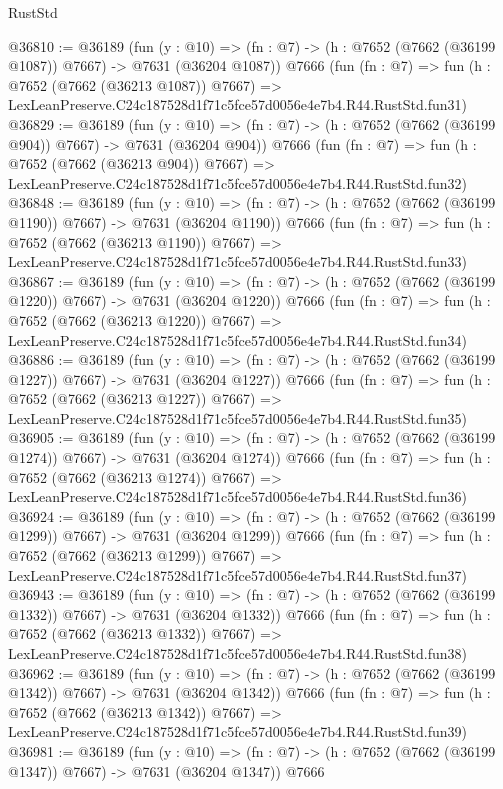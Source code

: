 \begin{lexlean}{RustStd}
\begin{coremodule}
@36810 := @36189
    (fun (y : @10) => (fn : @7) -> (h : @7652 (@7662 (@36199 @1087)) @7667) -> @7631 (@36204 @1087))
    @7666
    (fun (fn : @7) =>
    fun (h : @7652 (@7662 (@36213 @1087)) @7667) =>
    LexLeanPreserve.C24c187528d1f71c5fce57d0056e4e7b4.R44.RustStd.fun31)
@36829 := @36189
    (fun (y : @10) => (fn : @7) -> (h : @7652 (@7662 (@36199 @904)) @7667) -> @7631 (@36204 @904))
    @7666
    (fun (fn : @7) =>
    fun (h : @7652 (@7662 (@36213 @904)) @7667) =>
    LexLeanPreserve.C24c187528d1f71c5fce57d0056e4e7b4.R44.RustStd.fun32)
@36848 := @36189
    (fun (y : @10) => (fn : @7) -> (h : @7652 (@7662 (@36199 @1190)) @7667) -> @7631 (@36204 @1190))
    @7666
    (fun (fn : @7) =>
    fun (h : @7652 (@7662 (@36213 @1190)) @7667) =>
    LexLeanPreserve.C24c187528d1f71c5fce57d0056e4e7b4.R44.RustStd.fun33)
@36867 := @36189
    (fun (y : @10) => (fn : @7) -> (h : @7652 (@7662 (@36199 @1220)) @7667) -> @7631 (@36204 @1220))
    @7666
    (fun (fn : @7) =>
    fun (h : @7652 (@7662 (@36213 @1220)) @7667) =>
    LexLeanPreserve.C24c187528d1f71c5fce57d0056e4e7b4.R44.RustStd.fun34)
@36886 := @36189
    (fun (y : @10) => (fn : @7) -> (h : @7652 (@7662 (@36199 @1227)) @7667) -> @7631 (@36204 @1227))
    @7666
    (fun (fn : @7) =>
    fun (h : @7652 (@7662 (@36213 @1227)) @7667) =>
    LexLeanPreserve.C24c187528d1f71c5fce57d0056e4e7b4.R44.RustStd.fun35)
@36905 := @36189
    (fun (y : @10) => (fn : @7) -> (h : @7652 (@7662 (@36199 @1274)) @7667) -> @7631 (@36204 @1274))
    @7666
    (fun (fn : @7) =>
    fun (h : @7652 (@7662 (@36213 @1274)) @7667) =>
    LexLeanPreserve.C24c187528d1f71c5fce57d0056e4e7b4.R44.RustStd.fun36)
@36924 := @36189
    (fun (y : @10) => (fn : @7) -> (h : @7652 (@7662 (@36199 @1299)) @7667) -> @7631 (@36204 @1299))
    @7666
    (fun (fn : @7) =>
    fun (h : @7652 (@7662 (@36213 @1299)) @7667) =>
    LexLeanPreserve.C24c187528d1f71c5fce57d0056e4e7b4.R44.RustStd.fun37)
@36943 := @36189
    (fun (y : @10) => (fn : @7) -> (h : @7652 (@7662 (@36199 @1332)) @7667) -> @7631 (@36204 @1332))
    @7666
    (fun (fn : @7) =>
    fun (h : @7652 (@7662 (@36213 @1332)) @7667) =>
    LexLeanPreserve.C24c187528d1f71c5fce57d0056e4e7b4.R44.RustStd.fun38)
@36962 := @36189
    (fun (y : @10) => (fn : @7) -> (h : @7652 (@7662 (@36199 @1342)) @7667) -> @7631 (@36204 @1342))
    @7666
    (fun (fn : @7) =>
    fun (h : @7652 (@7662 (@36213 @1342)) @7667) =>
    LexLeanPreserve.C24c187528d1f71c5fce57d0056e4e7b4.R44.RustStd.fun39)
@36981 := @36189
    (fun (y : @10) => (fn : @7) -> (h : @7652 (@7662 (@36199 @1347)) @7667) -> @7631 (@36204 @1347))
    @7666

\end{coremodule}
\end{lexlean}
